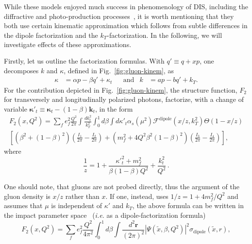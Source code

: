 \documentclass[11pt]{article}
\newcommand{\fdp}[0]{\mathcal{F}^{\mathrm{dipole}}}
\begin{document}
While these models enjoyed much success in phenomenology of DIS, including the
diffractive and photo-production
processes~\cite{Golec-Biernat:1998zce,Golec-Biernat:1999qor}, it is worth
mentioning that they both use certain kinematic approximation which follows from
subtle differences in the dipole factorization and the $k_T$-factorization.  In
the following, we will investigate effects of these approximations.

Firstly, let us outline the factorization formulas.
With $q'\equiv q+x p$, one decomposes $k$ and $\kappa$, defined in
Fig.~\ref{fig:gluon-kinem}, as
%
\begin{align}
    \kappa&=\alpha p-\beta q'+\kappa_t&&\mathrm{and}& k&=a p- bq'+k_T.
\end{align}
For the contribution depicted in Fig.~\ref{fig:gluon-kinem}, the structure function, $F_2$ for transversely and longitudinally polarized photons, factorize, with a change of variable  ${\boldsymbol{\kappa}'}_t\equiv{\boldsymbol{\kappa}_t}-(1-\beta)\mathbf{k}_t$, in the form~\cite{ Kimber:2001uaa,Kwiecinski:1997ee}
\begin{multline}
	F_2(x,Q^2)=\sum_f e_f^2 \frac{Q^2}{2\pi}\int\frac{dk^2_t}{k_T^2}\int^1_0d\beta\int d{\kappa'}_t\alpha_s(\mu^2) \fdp(x/z,k_T^2)\Theta(1-x/z)\\
	\left[\left(\beta^2+(1-\beta)^2\right)\left(\frac{I_1}{2\pi}-\frac{I_2}{2\pi}\right)
	+\left(m_f^2+4Q^2\beta^2(1-\beta)^2\right)\left(\frac{I_3}{2\pi}-\frac{I_4}{2\pi}\right)\right],
	\label{eq:angle-integrated}
\end{multline}
where
\begin{equation}
	\frac{1}{z}=1+\frac{{\kappa'}^2_t+m_f^2}{\beta(1-\beta)Q^2}+\frac{k^2_t}{Q^2}\,.
	\label{eq:z}
\end{equation}

One should note, that gluons are not probed directly, thus the argument of the
gluon density is $x/z$ rather than $x$.  If one, instead, uses $ 1/z=1+4
m_f^2/Q^2$ and assumes that $\mu$ is independent of $\kappa'$ and $k_T$, the
above formula can be written in the impact parameter
space~\cite{Golec-Biernat:1998zce,Nikolaev:1990ja} ({\it i.e.} as a
dipole-factorization formula)
%
\begin{equation}
  F_2\left(x,Q^2\right)=\sum_f e_f^2 \frac{Q^2}{4\pi^2} \int^1_0d\beta \int \frac{d^2\mathbf{r}}{(2\pi)^2} \left|\Psi\left(\tilde{x},\beta,Q^2\right)\right|^2\sigma_{\mathrm{dipole}}\left(\tilde{x},r\right),
  \label{eq:dipole-factorization}
\end{equation}
\end{document}
